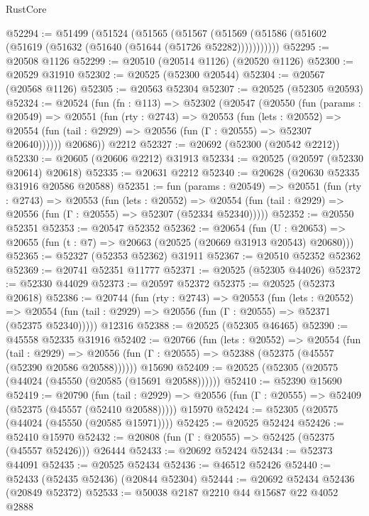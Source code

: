 \begin{lexlean}{RustCore}
\begin{coremodule}
@52294 := @51499
    (@51524
      (@51565
        (@51567 (@51569 (@51586 (@51602 (@51619 (@51632 (@51640 (@51644 (@51726 @52282)))))))))))
@52295 := @20508 @1126
@52299 := @20510 (@20514 @1126) (@20520 @1126)
@52300 := @20529 @31910
@52302 := @20525 (@52300 @20544)
@52304 := @20567 (@20568 @1126)
@52305 := @20563 @52304
@52307 := @20525 (@52305 @20593)
@52324 := @20524
    (fun (fn : @113) =>
    @52302
      (@20547
        (@20550
          (fun (params : @20549) =>
          @20551
            (fun (rty : @2743) =>
            @20553
              (fun (lets : @20552) =>
              @20554 (fun (tail : @2929) => @20556 (fun (Γ : @20555) => @52307 @20640))))))
        @20686))
    @2212
@52327 := @20692 (@52300 (@20542 @2212))
@52330 := @20605 (@20606 @2212) @31913
@52334 := @20525 (@20597 (@52330 @20614) @20618)
@52335 := @20631 @2212
@52340 := @20628 (@20630 @52335 @31916 @20586 @20588)
@52351 := fun (params : @20549) =>
  @20551
    (fun (rty : @2743) =>
    @20553
      (fun (lets : @20552) =>
      @20554 (fun (tail : @2929) => @20556 (fun (Γ : @20555) => @52307 (@52334 @52340)))))
@52352 := @20550 @52351
@52353 := @20547 @52352
@52362 := @20654
    (fun (U : @20653) => @20655 (fun (t : @7) => @20663 (@20525 (@20669 @31913 @20543) @20680)))
@52365 := @52327 (@52353 @52362) @31911
@52367 := @20510 @52352 @52362
@52369 := @20741 @52351 @11777
@52371 := @20525 (@52305 @44026)
@52372 := @52330 @44029
@52373 := @20597 @52372
@52375 := @20525 (@52373 @20618)
@52386 := @20744
    (fun (rty : @2743) =>
    @20553
      (fun (lets : @20552) =>
      @20554 (fun (tail : @2929) => @20556 (fun (Γ : @20555) => @52371 (@52375 @52340)))))
    @12316
@52388 := @20525 (@52305 @46465)
@52390 := @45558 @52335 @31916
@52402 := @20766
    (fun (lets : @20552) =>
    @20554
      (fun (tail : @2929) =>
      @20556 (fun (Γ : @20555) => @52388 (@52375 (@45557 (@52390 @20586 @20588))))))
    @15690
@52409 := @20525 (@52305 (@20575 (@44024 (@45550 (@20585 (@15691 @20588))))))
@52410 := @52390 @15690
@52419 := @20790
    (fun (tail : @2929) => @20556 (fun (Γ : @20555) => @52409 (@52375 (@45557 (@52410 @20588)))))
    @15970
@52424 := @52305 (@20575 (@44024 (@45550 (@20585 @15971))))
@52425 := @20525 @52424
@52426 := @52410 @15970
@52432 := @20808 (fun (Γ : @20555) => @52425 (@52375 (@45557 @52426))) @26444
@52433 := @20692 @52424
@52434 := @52373 @44091
@52435 := @20525 @52434
@52436 := @46512 @52426
@52440 := @52433 (@52435 @52436) (@20844 @52304)
@52444 := @20692 @52434 @52436 (@20849 @52372)
@52533 := @50038
    @2187
    @2210
    @44
    @15687
    @22
    @4052
    @2888

\end{coremodule}
\end{lexlean}
